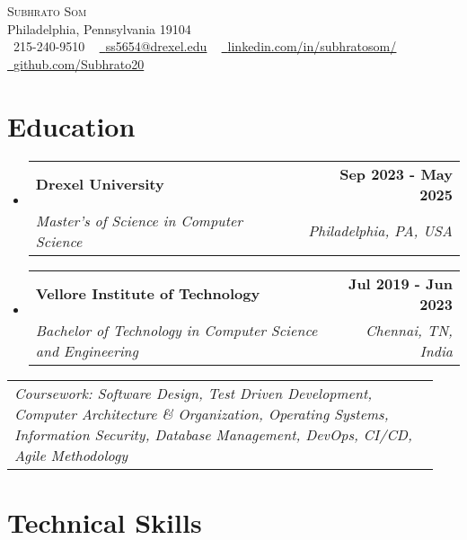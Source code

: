 \documentclass[letterpaper,11pt]{article}
\makeatletter
\newcommand{\resumeSubheading}[4]{
  \vspace{-2pt}\item
    \begin{tabular*}{1.0\textwidth}[t]{l@{\extracolsep{\fill}}r}
      \textbf{#1} & \textbf{\small #2} \\
      \textit{\small#3} & \textit{\small #4} \\
    \end{tabular*}\vspace{-7pt}
}
\newcommand{\resumeSubHeadingListStart}{\begin{itemize}[leftmargin=0.0in, label={}]}
\newcommand{\resumeSubHeadingListEnd}{\end{itemize}}
\makeatother
\begin{document}

\vspace{-16pt}
\begin{center}
    {\Huge \scshape Subhrato Som} \\ \vspace{1pt}
    Philadelphia, Pennsylvania 19104 \\ \vspace{1pt}
    \small \raisebox{-0.1\height}\faPhone\ 215-240-9510 ~ \href{mailto:ss5654@drexel.edu}{\raisebox{-0.2\height}\faEnvelope\  \underline{ss5654@drexel.edu}} ~ 
    \href{https://linkedin.com/in/subhratosom/}{\raisebox{-0.2\height}\faLinkedin\ \underline{linkedin.com/in/subhratosom/}}  ~
    \href{https://github.com/Subhrato20}{\raisebox{-0.2\height}\faGithub\ \underline{github.com/Subhrato20}}
    \vspace{-8pt}
\end{center}

\section{Education}
  \resumeSubHeadingListStart
  
    \resumeSubheading
      {Drexel University}{Sep 2023 - May 2025}
      {Master's of Science in Computer Science}{Philadelphia, PA, USA}

    \vspace{-5pt}
    \resumeSubheading
      {Vellore Institute of Technology}{Jul 2019 - Jun 2023}
      {Bachelor of Technology in Computer Science and Engineering}{Chennai, TN, India}
  
  \resumeSubHeadingListEnd
  \vspace{0.2em}
    \hspace{0.15in}\begin{tabular}{p{0.94\linewidth}}
    \textit{{Coursework}: Software Design, Test Driven Development, Computer Architecture \& Organization, Operating Systems, Information Security, Database Management, DevOps, CI/CD, Agile Methodology}
\end{tabular}
\vspace{-15pt}
\section{Technical Skills}
\end{document}
